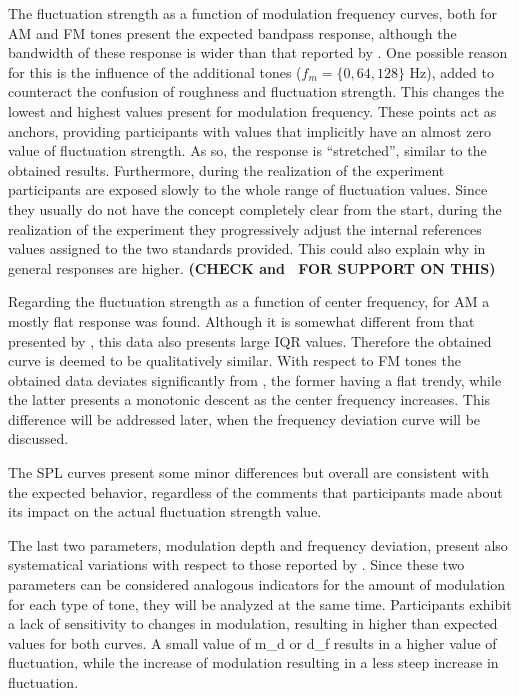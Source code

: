\documentclass[../main.tex]{subfiles}
\begin{document}
The fluctuation strength as a function of modulation frequency curves, both for
\gls{AM} and \gls{FM} tones present the expected bandpass response, although
the bandwidth of these response is wider than that reported by
\citeauthor{Fastl2007Psychoacoustics}. One possible reason for this is the
influence of the additional tones ($f_m = \{0, 64, 128\}$ Hz), added to
counteract the confusion of roughness and fluctuation strength. This changes
the lowest and highest values present for modulation frequency. These points
act as anchors, providing participants with values that implicitly have an
almost zero value of fluctuation strength. As so, the response is ``stretched'',
similar to the obtained results. Furthermore, during the realization of the
experiment participants are exposed slowly to the whole range of fluctuation
values. Since they usually do not have the concept completely clear from the
start, during the realization of the experiment they progressively adjust the
internal references values assigned to the two standards provided. This could
also explain why in general responses are higher. {\color{red} \bfseries (CHECK
\cite{Krantz1972} and~\cite{Marley1972} FOR SUPPORT ON THIS)}

Regarding the fluctuation strength as a function of center frequency, for
\gls{AM} a mostly flat response was found. Although it is somewhat different
from that presented by \citeauthor{Fastl2007Psychoacoustics}, this data also
presents large \gls{IQR} values. Therefore the obtained curve is deemed to be
qualitatively similar. With respect to \gls{FM} tones the obtained data
deviates significantly from \citeauthor{Fastl2007Psychoacoustics}, the former
having a flat trendy, while the latter presents a monotonic descent as the
center frequency increases. This difference will be addressed later, when the
frequency deviation curve will be discussed.

The \gls{SPL} curves present some minor differences but overall are consistent
with the expected behavior, regardless of the comments that participants made
about its impact on the actual fluctuation strength value.

The last two parameters, modulation depth and frequency deviation, present also
systematical variations with respect to those reported by
\citeauthor{Fastl2007Psychoacoustics}. Since these two parameters can be
considered analogous indicators for the amount of modulation for each type of
tone, they will be analyzed at the same time. Participants exhibit a lack of
sensitivity to changes in modulation, resulting in higher than expected values
for both curves. A small value of \gls{m_d} or \gls{d_f} results in a higher
value of fluctuation, while the increase of modulation resulting in a less
steep increase in fluctuation.
\end{document}
